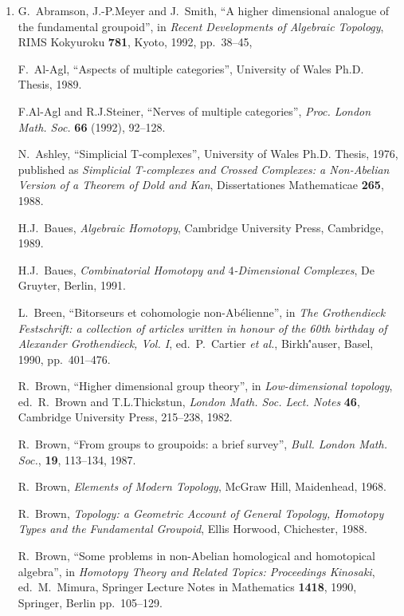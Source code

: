 \documentclass[12pt]{article}
\begin{document}
\begin{enumerate}
\def\labelenumi{\arabic{enumi})}
\setcounter{enumi}{2}
\item
  G.\ Abramson, J.-P.Meyer and J.\ Smith, ``A higher dimensional analogue of
  the fundamental groupoid'', in \emph{Recent Developments of Algebraic
  Topology}, RIMS Kokyuroku \textbf{781}, Kyoto, 1992, pp.\ 38--45, 

  F.\ Al-Agl, ``Aspects of multiple categories'', University of Wales Ph.D.
  Thesis, 1989.

  F.Al-Agl and R.J.Steiner, ``Nerves of multiple categories'',
  \emph{Proc. London Math. Soc.} \textbf{66} (1992), 92--128.

  N.\ Ashley, ``Simplicial T-complexes'', University of Wales Ph.D. Thesis,
  1976, published as \textsl{Simplicial T-complexes and Crossed Complexes: a 
  Non-Abelian Version of
  a Theorem of Dold and Kan}, Dissertationes Mathematicae \textbf{265}, 1988.

  H.J.\ Baues, \emph{Algebraic Homotopy}, Cambridge University Press, Cambridge,
  1989.

  H.J.\ Baues, \emph{Combinatorial Homotopy and \(4\)-Dimensional
  Complexes}, De Gruyter, Berlin, 1991.

  L.\ Breen, ``Bitorseurs et cohomologie non-Abélienne'', in \emph{The
  Grothendieck Festschrift: a collection of articles written in honour
  of the 60th birthday of Alexander Grothendieck, Vol. I}, ed.\
  P.\ Cartier \textit{et al.}, Birkh\''auser, Basel, 1990, pp.\ 401--476.

  R.\ Brown, ``Higher dimensional group theory'', in \emph{Low-dimensional
  topology}, ed.~R.\ Brown and T.L.Thickstun, \emph{London Math. Soc.
  Lect. Notes} \textbf{46}, Cambridge University Press, 215--238, 1982.

  R.\ Brown, ``From groups to groupoids: a brief survey'', \emph{Bull.
  London Math. Soc.}, \textbf{19}, 113--134, 1987.

  R.\ Brown, \emph{Elements of Modern Topology}, McGraw Hill, Maidenhead,
  1968.
  
   R.\ Brown, \emph{Topology: a Geometric Account of General Topology,
  Homotopy Types and the Fundamental Groupoid}, Ellis Horwood,
  Chichester, 1988.

  R.\ Brown, ``Some problems in non-Abelian homological and homotopical
  algebra'', in \emph{Homotopy Theory and Related Topics: Proceedings
  Kinosaki}, ed.\ M.\ Mimura, Springer Lecture Notes in
  Mathematics \textbf{1418}, 1990, Springer, Berlin pp.\ 105--129.


\end{enumerate}
\end{document}
